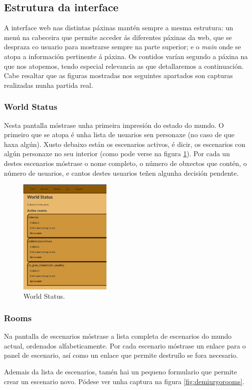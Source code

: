 \subsection{Estrutura da interface}
A interface web nas distintas páxinas mantén sempre a mesma estrutura: un menú
na cabeceira que permite acceder ás diferentes páxinas da web, que se despraza
co usuario para mostrarse sempre na parte superior; e o \textit{main} onde se
atopa a información pertinente á páxina. Os contidos varían segundo a páxina
na que nos atopemos, tendo especial relevancia as que detallaremos a
continuación. Cabe resaltar que as figuras mostradas nos seguintes apartados son
capturas realizadas nunha partida real.

\subsubsection{World Status}
Nesta pantalla móstrase unha primeira impresión do estado do mundo. O primeiro
que se atopa é unha lista de usuarios sen personaxe (no caso de que haxa algún).
Xusto debaixo están os escenarios activos, é dicir, os escenarios con algún
personaxe no seu interior (como pode verse na figura \ref{fig:demiurgoworld}).
Por cada un destes escenarios móstrase o nome completo, o número de obxectos que
contén, o número de usuarios, e cantos destes usuarios teñen algunha decisión
pendente.

\begin{figure}
\centerline{\includegraphics[width=0.4\textwidth]{figuras/demiurgo_world.png}}
\caption{World Status.}
\label{fig:demiurgoworld}
\end{figure}

\subsubsection{Rooms}
Na pantalla de escenarios móstrase a lista completa de escenarios do mundo
actual, ordenados alfabeticamente. Por cada escenario móstrase un enlace para o
panel de escenario, así como un enlace que permite destruílo se fora necesario.
\par
Ademais da lista de escenarios, tamén hai un pequeno formulario que permite
crear un escenario novo. Pódese ver unha captura na figura
\ref{fig:demiurgorooms}.

